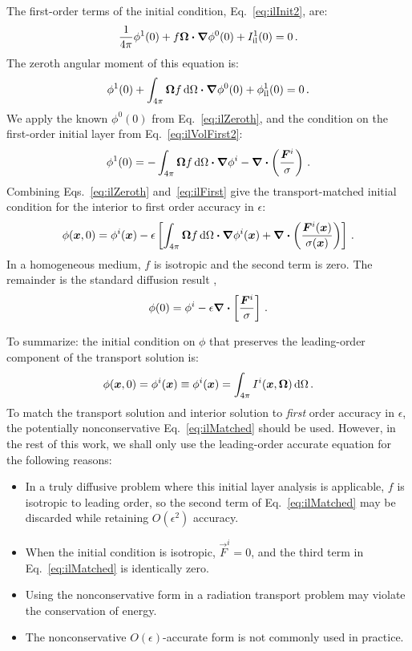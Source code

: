 The first-order terms of the initial condition, Eq.~\eqref{eq:ilInit2}, are:
\begin{equation*}
 \frac{1}{4\pi} \phi^{1}(0)
 + f \bm{\Omega} \bm{\cdot} \bm{\nabla} \phi^{0}(0)
 + I_\mathrm{il}^{1}(0) = 0\,.
\end{equation*}
The zeroth angular moment of this equation is:
\begin{equation}\label{eq:ilInitFirst}
 \phi^{1}(0)
 + \int_{4\pi}\bm{\Omega} f \mathop{}\!\mathrm{d}\Omega \bm{\cdot} \bm{\nabla} \phi^{0}(0)
 + \phi_\mathrm{il}^{1}(0) = 0\,.
\end{equation}
We apply the known $\phi^{0}(0)$ from
Eq.~\eqref{eq:ilZeroth}, and the condition on the first-order initial layer
from Eq.~\eqref{eq:ilVolFirst2}:
\begin{equation}\label{eq:ilFirst}
 \phi^{1}(0) = 
 - \int_{4\pi}\bm{\Omega} f \mathop{}\!\mathrm{d}\Omega \bm{\cdot} \bm{\nabla} \phi^i
 - \bm{\nabla} \bm{\cdot} \left(\frac{\bm{F}^i}{\sigma} \right)\,.
\end{equation}
Combining Eqs.~\eqref{eq:ilZeroth} and~\eqref{eq:ilFirst} give the
transport-matched initial condition for the interior to first order accuracy
in $\epsilon$:
\begin{equation}\label{eq:ilMatched}
  \phi(\bm{x},0) = \phi^i(\bm{x})
- \epsilon \left[ \int_{4\pi}\bm{\Omega} f \mathop{}\!\mathrm{d}\Omega \bm{\cdot} \bm{\nabla} \phi^i(\bm{x})
+ \bm{\nabla} \bm{\cdot} \left(\frac{\bm{F}^i(\bm{x})}{\sigma(\bm{x})} \right) \right]
\,.
\end{equation}
In a homogeneous medium, $f$ is isotropic and the second term is zero. The
remainder is the standard diffusion result \cite{Mal1991},
\begin{equation*}
 \phi(0) = \phi^i - \epsilon\bm{\nabla} \bm{\cdot} \left[\frac{\bm{F}^i}{\sigma} \right]\,.
\end{equation*}

To summarize: the initial condition on $\phi$ that preserves the leading-order
component of the transport solution is:
\begin{equation*}
  \phi(\bm{x},0) = \phi^i(\bm{x}) \equiv 
  \phi^i(\bm{x}) = \int_{4\pi} I^i(\bm{x},\bm{\Omega}) \mathop{}\!\mathrm{d}\Omega\,.
\end{equation*}
To match the transport solution and interior solution to \emph{first} order
accuracy in $\epsilon$, the potentially nonconservative
Eq.~\eqref{eq:ilMatched} should be used. However, in the rest of this work, we
shall only use the leading-order accurate equation for the following reasons:
\begin{itemize}
  \item In a truly diffusive problem where this initial layer analysis is
    applicable, $f$ is isotropic to leading order, so the second term of
    Eq.~\eqref{eq:ilMatched} may be discarded while retaining $O(\epsilon^2)$
    accuracy.
  \item When the initial condition is isotropic, $\vec{F}^i=0$, and the third
    term in Eq.~\eqref{eq:ilMatched} is identically zero.
  \item Using the nonconservative form in a radiation transport problem may
    violate the conservation of energy.
  \item The nonconservative $O(\epsilon)$-accurate form is not commonly used in
    practice.
\end{itemize}

